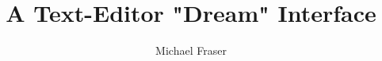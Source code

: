 \documentclass[11pt, oneside]{article}
\begin{document}
\title{A Text-Editor "Dream" Interface}
\author{Michael Fraser}
\maketitle

\tableofcontents
\end{document}
